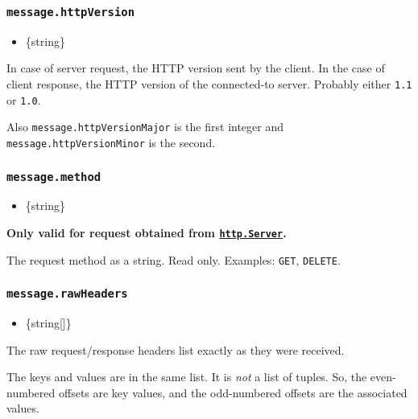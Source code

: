 \subsubsection{\texorpdfstring{\texttt{message.httpVersion}}{message.httpVersion}}\label{message.httpversion}

\begin{itemize}
\tightlist
\item
  \{string\}
\end{itemize}

In case of server request, the HTTP version sent by the client. In the
case of client response, the HTTP version of the connected-to server.
Probably either \texttt{\textquotesingle{}1.1\textquotesingle{}} or
\texttt{\textquotesingle{}1.0\textquotesingle{}}.

Also \texttt{message.httpVersionMajor} is the first integer and
\texttt{message.httpVersionMinor} is the second.

\subsubsection{\texorpdfstring{\texttt{message.method}}{message.method}}\label{message.method}

\begin{itemize}
\tightlist
\item
  \{string\}
\end{itemize}

\textbf{Only valid for request obtained from
\hyperref[class-httpserver]{\texttt{http.Server}}.}

The request method as a string. Read only. Examples:
\texttt{\textquotesingle{}GET\textquotesingle{}},
\texttt{\textquotesingle{}DELETE\textquotesingle{}}.

\subsubsection{\texorpdfstring{\texttt{message.rawHeaders}}{message.rawHeaders}}\label{message.rawheaders}

\begin{itemize}
\tightlist
\item
  \{string{[}{]}\}
\end{itemize}

The raw request/response headers list exactly as they were received.

The keys and values are in the same list. It is \emph{not} a list of
tuples. So, the even-numbered offsets are key values, and the
odd-numbered offsets are the associated values.

